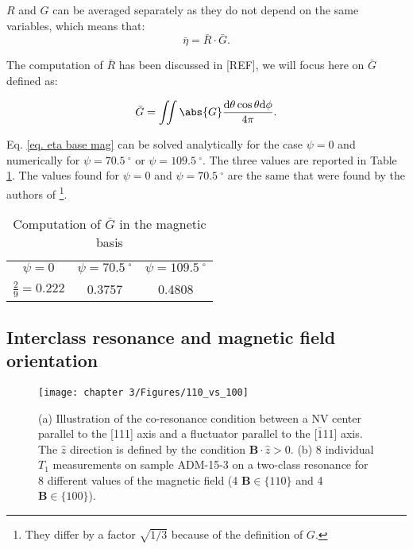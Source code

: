 \documentclass[a4paper, 11pt]{book}
\begin{document}
$R$ and $G$ can be averaged separately as they do not depend on the same variables, which means that:
\begin{equation}
\label{eq. eta bar r bar g bar}
\bar \eta = \bar R \cdot \bar G.
\end{equation} 

The computation of $\bar{R}$ has been discussed in [REF], we will focus here on $\bar{G}$ defined as:

\begin{equation}
\label{eq. eta base mag}
\bar{G}= \iint \abs{G} \frac{\rm d\theta \cos \theta \rm d\phi}{4 \pi}.
\end{equation}

Eq. \ref{eq. eta base mag} can be solved analytically for the case $\psi=0$ and numerically for $\psi=70.5 \ ^\circ$ or $\psi=109.5 \ ^\circ$. The three values are reported in Table \ref{table G mag}. The values found for $\psi=0$ and $\psi=70.5 \ ^\circ$ are the same that were found by the authors of \citep{choi2017depolarization} \footnote{They differ by a factor $\sqrt{1/3}$ because of the definition of $G$.}.

\begin{table}[htbp]
\centering
\caption{Computation of $\bar G$ in the magnetic basis}
 \label{table G mag}
\begin{tabular}{c|c|c}
\toprule
$\psi=0$ & $\psi=70.5 \ ^\circ$ & $\psi=109.5 \ ^\circ$ \\

$\frac{2}{9}=0.222$ & 0.3757 & 0.4808 \\
\bottomrule
\end{tabular}
\end{table}

\subsection{Interclass resonance and magnetic field orientation}

\begin{figure}[h!]
\centering
\texttt{[image: chapter 3/Figures/110\_vs\_100]}
\caption{(a) Illustration of the co-resonance condition between a NV center parallel to the [111] axis and a fluctuator parallel to the [$\bar 1$11] axis. The $\hat z$ direction is defined by the condition $\mathbf{B}\cdot\hat{z} >0$. (b) 8 individual $T_1$ measurements on sample ADM-15-3 on a two-class resonance for 8 different values of the magnetic field (4 $\mathbf{B} \in \{110\}$ and 4 $\mathbf{B} \in \{100\}$).}
\label{110 vs 100 annexe}
\end{figure}
\end{document}
